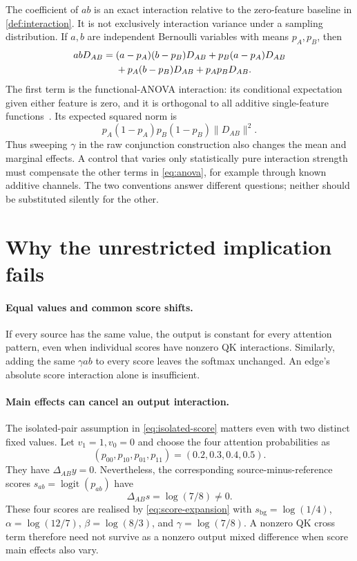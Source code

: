 \documentclass[11pt]{article}
\newcommand{\logit}{\operatorname{logit}}
\newcommand{\norm}[1]{\lVert #1\rVert}
\newcommand{\pairdiff}{\Delta_{AB}}
\theoremstyle{plain}
\theoremstyle{definition}
\theoremstyle{remark}
\begin{document}
The coefficient of $ab$ is an exact interaction relative to the zero-feature baseline in \cref{def:interaction}. It is not exclusively interaction variance under a sampling distribution. If $a,b$ are independent Bernoulli variables with means $p_A,p_B$, then
\begin{align}
 abD_{AB}={}&(a-p_A)(b-p_B)D_{AB}
       +p_B(a-p_A)D_{AB}\notag\\
       &+p_A(b-p_B)D_{AB}+p_Ap_BD_{AB}.
\label{eq:anova}
\end{align}
The first term is the functional-ANOVA interaction: its conditional expectation given either feature is zero, and it is orthogonal to all additive single-feature functions~\cite{lengerich2020}. Its expected squared norm is
\[
 p_A(1-p_A)p_B(1-p_B)\norm{D_{AB}}^2.
\]
Thus sweeping $\gamma$ in the raw conjunction construction also changes the mean and marginal effects. A control that varies only statistically pure interaction strength must compensate the other terms in \cref{eq:anova}, for example through known additive channels. The two conventions answer different questions; neither should be substituted silently for the other.

\section{Why the unrestricted implication fails}

\paragraph{Equal values and common score shifts.}
If every source has the same value, the output is constant for every attention pattern, even when individual scores have nonzero QK interactions. Similarly, adding the same $\gamma ab$ to every score leaves the softmax unchanged. An edge's absolute score interaction alone is insufficient.

\paragraph{Main effects can cancel an output interaction.}
The isolated-pair assumption in \cref{eq:isolated-score} matters even with two distinct fixed values. Let $v_1=1,v_0=0$ and choose the four attention probabilities as
\[
 (p_{00},p_{10},p_{01},p_{11})=(0.2,0.3,0.4,0.5).
\]
They have $\pairdiff y=0$. Nevertheless, the corresponding source-minus-reference scores $s_{ab}=\logit(p_{ab})$ have
\begin{equation}
 \pairdiff s=\log(7/8)\ne0.
\label{eq:cancellation}
\end{equation}
These four scores are realised by \cref{eq:score-expansion} with
$s_{\mathrm{bg}}=\log(1/4)$, $\alpha=\log(12/7)$, $\beta=\log(8/3)$, and $\gamma=\log(7/8)$. A nonzero QK cross term therefore need not survive as a nonzero output mixed difference when score main effects also vary.
\end{document}
